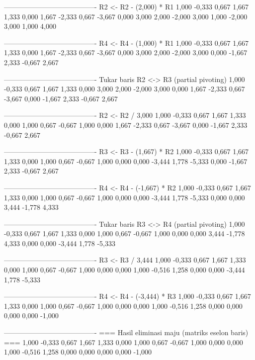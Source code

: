 \documentclass[12pt]{article}
\begin{document}
\begin{enumerate}
\begin{keluaran}
----------------------------------------
R2 <- R2 - (2,000) * R1
1,000   -0,333  0,667   1,667   1,333
0,000   1,667   -2,333  0,667   -3,667
0,000   3,000   2,000   -2,000  3,000
1,000   -2,000  3,000   1,000   4,000

----------------------------------------
R4 <- R4 - (1,000) * R1
1,000   -0,333  0,667   1,667   1,333
0,000   1,667   -2,333  0,667   -3,667
0,000   3,000   2,000   -2,000  3,000
0,000   -1,667  2,333   -0,667  2,667

----------------------------------------
Tukar baris R2 <-> R3 (partial pivoting)
1,000   -0,333  0,667   1,667   1,333
0,000   3,000   2,000   -2,000  3,000
0,000   1,667   -2,333  0,667   -3,667
0,000   -1,667  2,333   -0,667  2,667

----------------------------------------
R2 <- R2 / 3,000
1,000   -0,333  0,667   1,667   1,333
0,000   1,000   0,667   -0,667  1,000
0,000   1,667   -2,333  0,667   -3,667
0,000   -1,667  2,333   -0,667  2,667

----------------------------------------
R3 <- R3 - (1,667) * R2
1,000   -0,333  0,667   1,667   1,333
0,000   1,000   0,667   -0,667  1,000
0,000   0,000   -3,444  1,778   -5,333
0,000   -1,667  2,333   -0,667  2,667

----------------------------------------
R4 <- R4 - (-1,667) * R2
1,000   -0,333  0,667   1,667   1,333
0,000   1,000   0,667   -0,667  1,000
0,000   0,000   -3,444  1,778   -5,333
0,000   0,000   3,444   -1,778  4,333

----------------------------------------
Tukar baris R3 <-> R4 (partial pivoting)
1,000   -0,333  0,667   1,667   1,333
0,000   1,000   0,667   -0,667  1,000
0,000   0,000   3,444   -1,778  4,333
0,000   0,000   -3,444  1,778   -5,333

----------------------------------------
R3 <- R3 / 3,444
1,000   -0,333  0,667   1,667   1,333
0,000   1,000   0,667   -0,667  1,000
0,000   0,000   1,000   -0,516  1,258
0,000   0,000   -3,444  1,778   -5,333

----------------------------------------
R4 <- R4 - (-3,444) * R3
1,000   -0,333  0,667   1,667   1,333
0,000   1,000   0,667   -0,667  1,000
0,000   0,000   1,000   -0,516  1,258
0,000   0,000   0,000   0,000   -1,000

----------------------------------------
=== Hasil eliminasi maju (matriks eselon baris) ===
1,000   -0,333  0,667   1,667   1,333
0,000   1,000   0,667   -0,667  1,000
0,000   0,000   1,000   -0,516  1,258
0,000   0,000   0,000   0,000   -1,000


\end{keluaran}
\end{enumerate}
\end{document}
